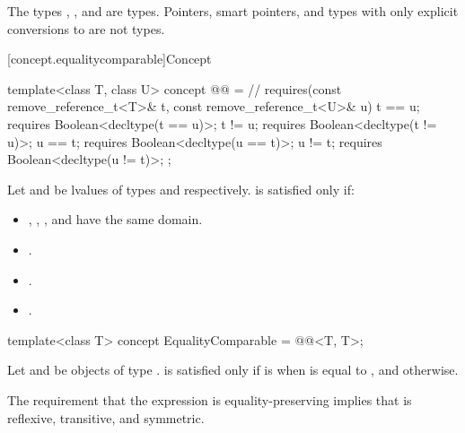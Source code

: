\pnum
\begin{example}
The types , , and
 are 
types. Pointers, smart pointers, and types with only explicit conversions to
 are not  types.
\end{example}

[concept.equalitycomparable]{Concept }

\begin{itemdecl}
template<class T, class U>
concept @@ = // \expos
  requires(const remove_reference_t<T>& t,
           const remove_reference_t<U>& u) {
    t == u; requires Boolean<decltype(t == u)>;
    t != u; requires Boolean<decltype(t != u)>;
    u == t; requires Boolean<decltype(u == t)>;
    u != t; requires Boolean<decltype(u != t)>;
  };
\end{itemdecl}

\begin{itemdescr}
\pnum
Let  and  be lvalues of types
 and
 respectively.
is satisfied only if:
\begin{itemize}
\item {}, , , and 
      have the same domain.
\item {}.
\item {}.
\item {}.
\end{itemize}
\end{itemdescr}

%
\begin{itemdecl}
template<class T>
concept EqualityComparable = @@<T, T>;
\end{itemdecl}

\begin{itemdescr}
\pnum
Let  and  be objects of type .
 is satisfied only if
 is  when  is equal to
, and  otherwise.

\pnum
\begin{note}
The requirement that the expression  is equality-preserving
implies that \tcode{==} is reflexive, transitive, and symmetric.
\end{note}
\end{itemdescr}


